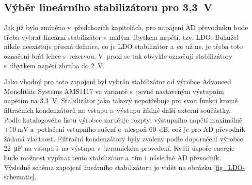 


\subsection{Výběr lineárního stabilizátoru pro 3,3~V}

Jak již bylo zmíněno v~předchozích kapitolách, pro napájení AD převodníku bude třeba vybrat lineární stabilizátor s~malým úbytkem napětí, tzv. LDO. Bohužel nikde neexistuje přesná definice, co je LDO stabilizátor a~co už ne, je třeba toto označení brát lehce s~rezervou. V~praxi se tak obvykle označují stabilizátory s~úbytkem napětí zhruba do \SI{2}{\volt}.

Jako vhodný pro toto zapojení byl vybrán stabilizátor od výrobce Advanced Monolithic Systems AMS1117 \cite{dat_AMS1117} ve variantě s~pevně nastaveným výstupním napětím na \SI{3,3}{\volt}. Stabilizátor jako takový nepotřebuje pro svou funkci kromě filtračních kondenzátorů na vstupu a~výstupu žádné další externí součástky. Podle katalogového listu výrobce zaručuje rozptyl výstupního napětí maximálně $\pm\SI{10}{\milli\volt}$ a~potlačení vstupního rušení o~alespoň \SI{60}{\deci\bel}, což je pro AD převodník žádaná vlastnost. Filtrační kondenzátory byly zvoleny podle doporučení výrobce \SI{22}{\micro\farad} na vstupu i~na výstupu v~keramickém provedení. Kvůli úspoře energie bude možnost vypínat tento stabilizátor a~tím i~následně AD převodník. Výsledné schéma zapojení lineárního stabilizátoru je vidět na obrázku \ref{fig_LDO-schematic}.

